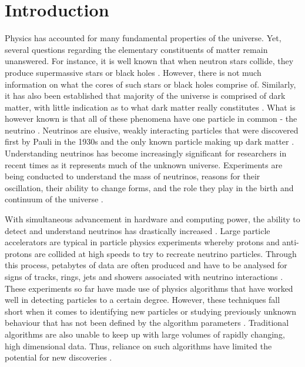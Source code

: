 \chapter{Introduction}

\ifpdf
    \graphicspath{{1_introduction/figures/PNG/}{1_introduction/figures/PDF/}{1_introduction/figures/}}
\else
    \graphicspath{{1_introduction/figures/EPS/}{1_introduction/figures/}}
\fi

Physics has accounted for many fundamental properties of the universe. Yet, several questions regarding the elementary constituents of matter remain unanswered. For instance, it is well known that when neutron stars collide, they produce supermassive stars or black holes \cite{bekenstein1973black}. However, there is not much information on what the cores of such stars or black holes comprise of. Similarly, it has also been established that majority of the universe is comprised of dark matter, with little indication as to what dark matter really constitutes \cite{halliwell1985origin}. What is however known is that all of these phenomena have one particle in common - the neutrino \cite{bekenstein1973black}. Neutrinos are elusive, weakly interacting particles that were discovered first by Pauli in the 1930s and the only known particle making up dark matter \cite{bilenky2013neutrino, roberts1992birth}. Understanding neutrinos has become increasingly significant for researchers in recent times as it represents much of the unknown universe. Experiments are being conducted to understand the mass of neutrinos, reasons for their oscillation, their ability to change forms, and the role they play in the birth and continuum of the universe \cite{gray2011cosmic}. 

With simultaneous advancement in hardware and computing power, the ability to detect and understand neutrinos has drastically increased \cite{bilenky2013neutrino, roberts1992birth, acciarri2016long, acciarri2017convolutional, albert2020antares, aiello2019sensitivity}. Large particle accelerators are typical in particle physics experiments whereby protons and anti-protons are collided at high speeds to try to recreate neutrino particles. Through this process, petabytes of data are often produced and have to be analysed for signs of tracks, rings, jets and showers associated with neutrino interactions \cite{britton2014deal}. These experiments so far have made use of physics algorithms that have worked well in detecting particles to a certain degree. However, these techniques fall short when it comes to identifying new particles or studying previously unknown behaviour that has not been defined by the algorithm parameters \cite{edelen2016neural}. Traditional algorithms are also unable to keep up with large volumes of rapidly changing, high dimensional data. Thus, reliance on such algorithms have limited the potential for new discoveries \cite{edelen2016neural}.


